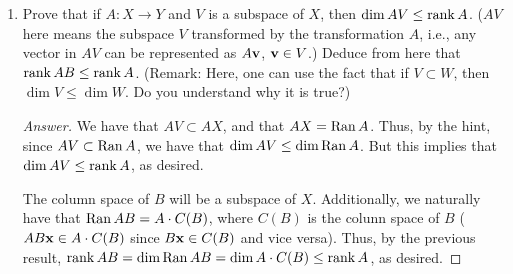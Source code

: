 \documentclass[../psets.tex]{subfiles}
\begin{document}
\begin{enumerate}[label={\textbf{7.\arabic*.}}]
\begin{enumerate}
\begin{proof}[Answer]
        \end{proof}
        \item The rank of a matrix is equal to the maximum number of linearly independent rows in the matrix.
        \begin{proof}[Answer]
            True.\par
            Each pivot row is linearly independent, and the rank is equal to the number of pivot rows/columns.
        \end{proof}
        \item The rank of an $n\times n$ matrix is at most $n$.
        \begin{proof}[Answer]
            True.\par
            Each linearly independent column contributes $+1$ to the rank, and since an $n\times n$ matrix can have at most $n$ \emph{columns}, it certainly cannot have more than $n$ \emph{linearly independent columns}.
        \end{proof}
        \item An $n\times n$ matrix having rank $n$ is invertible.
        \begin{proof}[Answer]
            True.\par
            If an $n\times n$ matrix has rank $n$, then it has $n$ pivot columns. But this implies by 3.6 that it is invertible.
        \end{proof}
    \end{enumerate}
    \setcounter{enumi}{3}
    \item Prove that if $A:X\to Y$ and $V$ is a subspace of $X$, then $\dim AV\leq\operatorname{rank} A$. ($AV$ here means the subspace $V$ transformed by the transformation $A$, i.e., any vector in $AV$ can be represented as $A\mathbf{v}$, $\mathbf{v}\in V$.) Deduce from here that $\operatorname{rank} AB\leq\operatorname{rank} A$. (Remark: Here, one can use the fact that if $V\subset W$, then $\dim V\leq\dim W$. Do you understand why it is true?)
    \begin{proof}[Answer]
        We have that $AV\subset AX$, and that $AX=\operatorname{Ran} A$. Thus, by the hint, since $AV\subset\operatorname{Ran} A$, we have that $\dim AV\leq\dim\operatorname{Ran} A$. But this implies that $\dim AV\leq\operatorname{rank} A$, as desired.\par
        The column space of $B$ will be a subspace of $X$. Additionally, we naturally have that $\operatorname{Ran} AB=A\cdot C(B)$, where $C(B)$ is the colunn space of $B$ ($AB\mathbf{x}\in A\cdot C(B)$ since $B\mathbf{x}\in C(B)$ and vice versa). Thus, by the previous result, $\operatorname{rank} AB=\dim\operatorname{Ran} AB=\dim A\cdot C(B)\leq\operatorname{rank} A$, as desired.
    \end{proof}

\end{enumerate}
\end{document}
